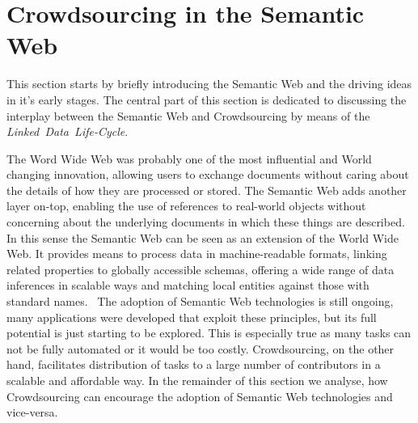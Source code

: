 \section{Crowdsourcing in the Semantic Web}
This section starts by briefly introducing the Semantic Web and the driving ideas in it's early stages. The central part of this section is dedicated to discussing the interplay between the Semantic Web and Crowdsourcing by means of the \textit{Linked~Data~Life-Cycle}. 

The Word Wide Web was probably one of the most influential and World changing innovation, allowing users to exchange documents without caring about the details of how they are processed or stored. The Semantic Web adds another layer on-top, enabling the use of references to real-world objects without concerning about the underlying documents in which these things are described. In this sense the Semantic Web can be seen as an extension of the World Wide Web. It provides means to process data in machine-readable formats, linking related properties to globally accessible schemas, offering a wide range of data inferences in scalable ways and matching local entities against those with standard names.~\cite{hendler2010} 
The adoption of Semantic Web technologies is still ongoing, many applications were developed that exploit these principles, but its full potential is just starting to be explored. This is especially true as many tasks can not be fully automated or it would be too costly. Crowdsourcing, on the other hand, facilitates distribution of tasks to a large number of contributors in a scalable and affordable way. In the remainder of this section we analyse, how Crowdsourcing can encourage the adoption of Semantic Web technologies and vice-versa. 

